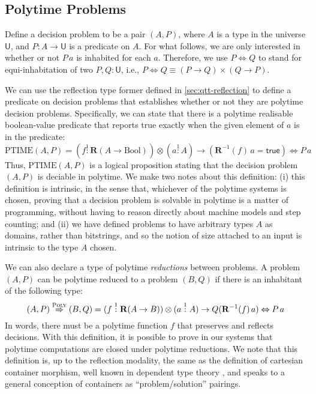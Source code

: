 \documentclass[acmsmall,screen]{acmart}
\newcommand{\BoolTy}{\mathrm{Bool}}
\newcommand{\cTrue}{\mathsf{true}}
\begin{document}
\subsection{Polytime Problems}
\label{sec:polytime-problems}

Define a decision problem to be a pair $(A, P)$, where $A$ is a type
in the universe $\mathsf{U}$, and $P : A \to \mathsf{U}$ is a
predicate on $A$. For what follows, we are only interested in whether
or not $P\,a$ is inhabited for each $a$. Therefore, we use
$P \Leftrightarrow Q$ to stand for equi-inhabitation of two
$P, Q : \mathsf{U}$, i.e.,
$P \Leftrightarrow Q \equiv (P \to Q) \times (Q \to P)$.

We can use the reflection type former defined in
\autoref{sec:qtt-reflection} to define a predicate on decision
problems that establishes whether or not they are polytime decision
problems. Specifically, we can state that there is a polytime
realisable boolean-value predicate that reports true exactly when the
given element of $a$ is in the predicate:
\begin{displaymath}
  \mathrm{PTIME}(A,P) =
    (f \stackrel1: \mathbf{R}(A \to \BoolTy)) \otimes (a \stackrel1: A) \to (\mathbf{R}^{-1}(f)\, a = \cTrue) \Leftrightarrow P\,a
\end{displaymath}
Thus, $\mathrm{PTIME}(A,P)$ is a logical proposition stating that the
decision problem $(A,P)$ is deciable in polytime. We make two notes
about this definition: (i) this definition is intrinsic, in the sense
that, whichever of the polytime systems is chosen, proving that a
decision problem is solvable in polytime is a matter of programming,
without having to reason directly about machine models and step
counting; and (ii) we have defined problems to have arbitrary types
$A$ as domains, rather than bitstrings, and so the notion of size
attached to an input is intrinsic to the type $A$ chosen.

We can also declare a type of polytime \emph{reductions} between
problems. A problem $(A, P)$ can be polytime reduced to a problem
$(B,Q)$ if there is an inhabitant of the following type:
\begin{displaymath}
  (A,P) \stackrel{\textsc{Poly}}\Rightarrow (B,Q) = (f \stackrel1: \mathbf{R}(A \to B)) \otimes (a \stackrel1: A) \to Q(\mathbf{R}^{-1}(f)\,a) \Leftrightarrow P\,a
\end{displaymath}
In words, there must be a polytime function $f$ that preserves and
reflects decisions. With this definition, it is possible to prove in
our systems that polytime computations are closed under polytime
reductions. We note that this definition is, up to the reflection
modality, the same as the definition of cartesian container morphism,
well known in dependent type theory \cite{AbbottAG05}, and speaks to a
general conception of containers as ``problem/solution'' pairings.
\end{document}
